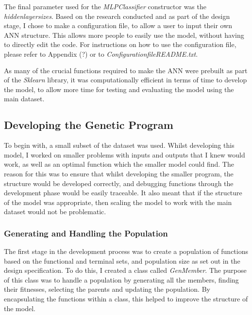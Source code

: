 \documentclass[11pt]{article}
\begin{document}
The final parameter used for the \textit{MLPClassifier} constructor was the \textit{hidden\textunderscore layer\textunderscore sizes}. Based on the research conducted and as part of the design stage, I chose to make a configuration file, to allow a user to input their own ANN structure. This allows more people to easily use the model, without having to directly edit the code. For instructions on how to use the configuration file, please refer to Appendix (?) or to \textit{Configuration\textunderscore file\textunderscore README.txt}.

As many of the crucial functions required to make the ANN were prebuilt as part of the \textit{Sklearn} library, it was computationally efficient in terms of time to develop the model, to allow more time for testing and evaluating the model using the main dataset. 
\subsection{Developing the Genetic Program}\label{subsec:DEVGP}
To begin with, a small subset of the dataset was used. Whilst developing this model, I worked on smaller problems with inputs and outputs that I knew would work, as well as an optimal function which the smaller model could find. The reason for this was to ensure that whilst developing the smaller program, the structure would be developed correctly, and debugging functions through the development phase would be easily traceable. It also meant that if the structure of the model was appropriate, then scaling the model to work with the main dataset would not be problematic. 
 \subsubsection{Generating and Handling the Population}\label{subsubsec:sf}
The first stage in the development process was to create a population of functions based on the functional and terminal sets, and population size as set out in the design specification. To do this, I created a class called \textit{GenMember}. The purpose of this class was to handle a population by generating all the members, finding their fitnesses, selecting the parents and updating the population. By encapsulating the functions within a class, this helped to improve the structure of the model. 
\end{document}
